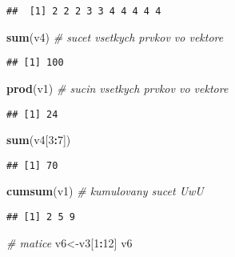\documentclass[
]{article}
\newenvironment{Shaded}{\begin{snugshade}}{\end{snugshade}}
\newcommand{\CommentTok}[1]{\textcolor[rgb]{0.56,0.35,0.01}{\textit{#1}}}
\newcommand{\DecValTok}[1]{\textcolor[rgb]{0.00,0.00,0.81}{#1}}
\newcommand{\FunctionTok}[1]{\textcolor[rgb]{0.13,0.29,0.53}{\textbf{#1}}}
\newcommand{\NormalTok}[1]{#1}
\newcommand{\OtherTok}[1]{\textcolor[rgb]{0.56,0.35,0.01}{#1}}
\newcommand{\SpecialCharTok}[1]{\textcolor[rgb]{0.81,0.36,0.00}{\textbf{#1}}}
\begin{document}
\begin{verbatim}
##  [1] 2 2 2 3 3 4 4 4 4 4
\end{verbatim}

\begin{Shaded}
\begin{Highlighting}[]
\FunctionTok{sum}\NormalTok{(v4) }\CommentTok{\# sucet vsetkych prvkov vo vektore}
\end{Highlighting}
\end{Shaded}

\begin{verbatim}
## [1] 100
\end{verbatim}

\begin{Shaded}
\begin{Highlighting}[]
\FunctionTok{prod}\NormalTok{(v1) }\CommentTok{\# sucin vsetkych prvkov vo vektore}
\end{Highlighting}
\end{Shaded}

\begin{verbatim}
## [1] 24
\end{verbatim}

\begin{Shaded}
\begin{Highlighting}[]
\FunctionTok{sum}\NormalTok{(v4[}\DecValTok{3}\SpecialCharTok{:}\DecValTok{7}\NormalTok{])}
\end{Highlighting}
\end{Shaded}

\begin{verbatim}
## [1] 70
\end{verbatim}

\begin{Shaded}
\begin{Highlighting}[]
\FunctionTok{cumsum}\NormalTok{(v1) }\CommentTok{\# kumulovany sucet UwU}
\end{Highlighting}
\end{Shaded}

\begin{verbatim}
## [1] 2 5 9
\end{verbatim}

\begin{Shaded}
\begin{Highlighting}[]
\CommentTok{\# matice}
\NormalTok{v6}\OtherTok{\textless{}{-}}\NormalTok{v3[}\DecValTok{1}\SpecialCharTok{:}\DecValTok{12}\NormalTok{]}
\NormalTok{v6}
\end{Highlighting}
\end{Shaded}
\end{document}
